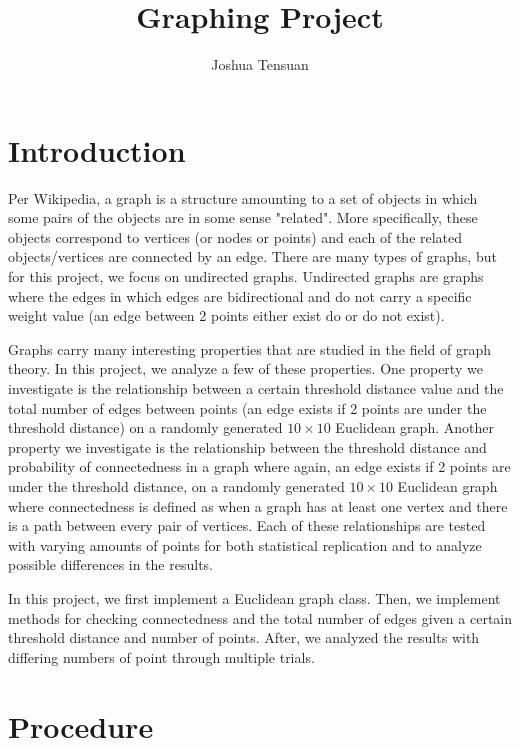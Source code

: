 \documentclass[11pt]{article}
\begin{document}
\author{Joshua Tensuan}
\title{Graphing Project}
\maketitle

\medskip

\section{Introduction}

Per Wikipedia, a graph is a structure amounting to a set of objects in which some pairs of the objects are in some sense "related". More specifically, these objects correspond to vertices (or nodes or points) and each of the related objects/vertices are connected by an edge. There are many types of graphs, but for this project, we focus on undirected graphs. Undirected graphs are graphs where the edges in which edges are bidirectional and do not carry a specific weight value (an edge between 2 points either exist do or do not exist). 

Graphs carry many interesting properties that are studied in the field of graph theory. In this project, we analyze a few of these properties. One property we investigate is the relationship between a certain threshold distance value and the total number of edges between points (an edge exists if 2 points are under the threshold distance) on a randomly generated $10\times 10$ Euclidean graph. Another property we investigate is the relationship between the threshold distance and probability of connectedness in a graph where again, an edge exists if 2 points are under the threshold distance, on a randomly generated $10\times 10$ Euclidean graph where connectedness is defined as when a graph has at least one vertex and there is a path between every pair of vertices. Each of these relationships are tested with varying amounts of points for both statistical replication and to analyze possible differences in the results.

In this project, we first implement a Euclidean graph class. Then, we implement methods for checking connectedness and the total number of edges given a certain threshold distance and number of points. After, we analyzed the results with differing numbers of point through multiple trials.

\section{Procedure}
\end{document}
